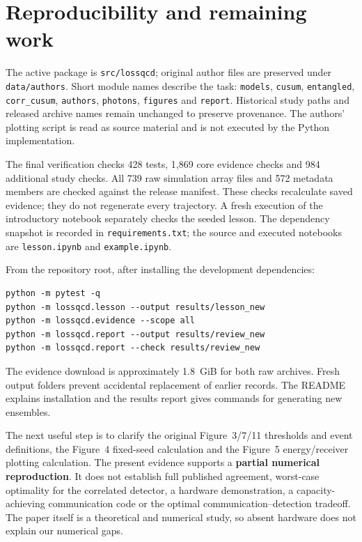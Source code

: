 \documentclass[11pt,a4paper]{article}
\begin{document}
\section{Reproducibility and remaining work}
The active package is \texttt{src/lossqcd}; original author files are preserved
under \texttt{data/authors}. Short module names describe the task:
\texttt{models}, \texttt{cusum}, \texttt{entangled}, \texttt{corr\_cusum},
\texttt{authors}, \texttt{photons}, \texttt{figures} and \texttt{report}.
Historical study paths and released archive names remain unchanged to preserve
provenance. The authors' plotting script is read as source material and is not
executed by the Python implementation.

The final verification checks 428 tests, 1,869 core evidence checks and
984 additional study checks. All 739 raw simulation array files and
572 metadata members are checked against the release manifest. These checks
recalculate saved evidence; they do not regenerate every trajectory. A fresh
execution of the introductory notebook separately checks the seeded lesson.
The dependency snapshot is recorded in \texttt{requirements.txt}; the source
and executed notebooks are \texttt{lesson.ipynb} and \texttt{example.ipynb}.

From the repository root, after installing the development dependencies:
\begin{verbatim}
python -m pytest -q
python -m lossqcd.lesson --output results/lesson_new
python -m lossqcd.evidence --scope all
python -m lossqcd.report --output results/review_new
python -m lossqcd.report --check results/review_new
\end{verbatim}
The evidence download is approximately 1.8~GiB for both raw archives.
Fresh output folders prevent accidental replacement of earlier records.
The README explains installation and the results report gives commands for
generating new ensembles.

The next useful step is to clarify the original Figure~3/7/11 thresholds and
event definitions, the Figure~4 fixed-seed calculation and the Figure~5
energy/receiver plotting calculation. The present evidence supports a
\textbf{partial numerical reproduction}. It does not establish full published
agreement, worst-case optimality for the correlated detector, a hardware
demonstration, a capacity-achieving communication code or the optimal
communication--detection tradeoff. The paper itself is a theoretical and
numerical study, so absent hardware does not explain our numerical gaps.
\end{document}
